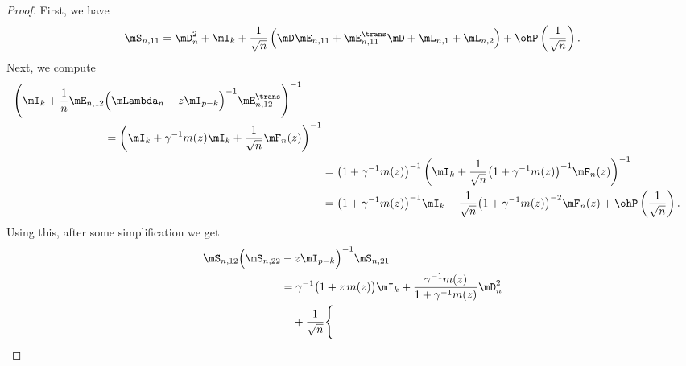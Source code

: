 \begin{proof}
    First, we have
    \[
        \mS_{n,11} 
            = 
                \mD_n^2 + \mI_k
                + 
                \frac{1}{\sqrt{n}}
                \left(
                    \mD \mE_{n,11}
                    +
                    \mE_{n,11}^\trans \mD
                    +
                    \mL_{n,1}
                    +
                    \mL_{n,2}
                \right)
                +
                \ohP\left( \frac{1}{\sqrt{n}} \right).
    \]
    Next, we compute
    \begin{align*}
        \begin{split}
        \Bigg(
            \mI_k
            +
            \frac{1}{n}
            \mE_{n,12}
            &\Big(
                \mLambda_n - z \mI_{p-k}
            \Big)^{-1}
            \mE_{n,12}^\trans
        \Bigg)^{-1} \\
            &=
                \left(
                    \mI_k
                    +
                    \gamma^{-1}
                    m( z )
                    \mI_k
                    +
                    \frac{1}{\sqrt{n}}
                    \mF_n(z)
                \right)^{-1} 
        \end{split} \\
            &=
                \big(1 + \gamma^{-1} m(z)\big)^{-1}
                \left(
                    \mI_k
                    +
                    \frac{1}{\sqrt{n}}
                    \big( 1 + \gamma^{-1} m(z) \big)^{-1}
                    \mF_{n}(z)
                \right)^{-1} \\
            &=
                \big( 1 + \gamma^{-1} m(z) \big)^{-1} \mI_k
                -
                \frac{1}{\sqrt{n}}
                \big( 1 + \gamma^{-1} m(z) \big)^{-2}
                \mF_{n}(z)
                +
                \ohP\left( \frac{1}{\sqrt{n}} \right).              
    \end{align*}
    Using this, after some simplification we get
    \[
        \begin{split}
            \mS_{n,12} 
            \Big( \mS_{n,22} &- z \mI_{p-k} \Big)^{-1} 
            \mS_{n,21} \\
                &=
                \gamma^{-1}
                \big( 1 + z \, m(z) \big) \mI_k
                +
                \frac{\gamma^{-1} m(z)}
                     { 1 + \gamma^{-1} m(z)} \mD_n^2 \\
                &\quad+
                \frac{1}{\sqrt{n}} \Bigg\{

\end{split}\]
\end{proof}
